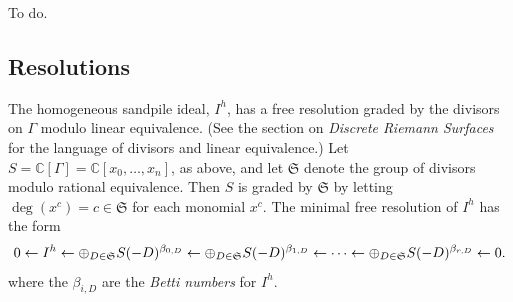 \documentclass[letterpaper,10pt,english]{manual}
\begin{document}
To do.


\subsection{Resolutions}

The homogeneous sandpile ideal, $I^h$, has a free resolution graded by the
divisors on $\Gamma$ modulo linear equivalence.  (See the section on
\emph{Discrete Riemann Surfaces} for the language of
divisors and linear equivalence.)  Let
$S=\mathbb{C}[\Gamma]=\mathbb{C}[x_0,\dots,x_n]$, as above, and let
$\mathfrak{S}$ denote the group of divisors modulo rational equivalence.  Then
$S$ is graded by $\mathfrak{S}$ by letting $\deg(x^c)= c\in\mathfrak{S}$ for
each monomial $x^c$.  The minimal free resolution of $I^h$ has the form
\begin{gather}
\begin{split} 0\leftarrow I^h
\leftarrow\oplus_{D\in\mathfrak{S}}S(-D)^{\beta_{0,D}}\leftarrow\oplus_{D\in\mathfrak{S}}S(-D)^{\beta_{1,D}}
\leftarrow\dots\leftarrow\oplus_{D\in\mathfrak{S}}S(-D)^{\beta_{r,D}}\leftarrow0.\end{split}\notag
\end{gather}
where the $\beta_{i,D}$ are the \emph{Betti numbers} for $I^h$.
\end{document}
